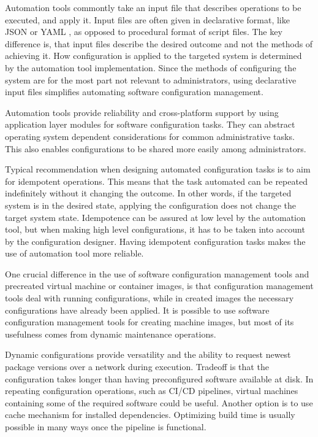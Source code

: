 \documentclass[officiallayout]{tktla}
\begin{document}
Automation tools commontly take an input file that describes operations to be
executed, and apply it. Input files are often given in declarative format, like
JSON \cite{json} or YAML \cite{yaml}, as opposed to procedural format of script
files. The key difference is, that input files describe the desired outcome and
not the methods of achieving it. How configuration is applied to the targeted
system is determined by the automation tool implementation. Since the methods
of configuring the system are for the most part not relevant to administrators,
using declarative input files simplifies automating software configuration
management.

Automation tools provide reliability and cross-platform support by using
application layer modules for software configuration tasks. They can abstract
operating system dependent considerations for common administrative tasks. This
also enables configurations to be shared more easily among administrators.

Typical recommendation when designing automated configuration tasks is to aim
for idempotent operations. This means that the task automated can be repeated
indefinitely without it changing the outcome. In other words, if the targeted
system is in the desired state, applying the configuration does not change the
target system state. Idempotence can be assured at low level by the automation
tool, but when making high level configurations, it has to be taken into
account by the configuration designer. Having idempotent configuration tasks
makes the use of automation tool more reliable.

One crucial difference in the use of software configuration management tools
and precreated virtual machine or container images, is that configuration
management tools deal with running configurations, while in created images the
necessary configurations have already been applied. It is possible to use
software configuration management tools for creating machine images, but most
of its usefulness comes from dynamic maintenance operations.

Dynamic configurations provide versatility and the ability to request newest
package versions over a network during execution. Tradeoff is that the
configuration takes longer than having preconfigured software available at
disk. In repeating configuration operations, such as CI/CD pipelines, virtual
machines containing some of the required software could be useful. Another
option is to use cache mechanism for installed dependencies. Optimizing build
time is usually possible in many ways once the pipeline is functional.
\end{document}
